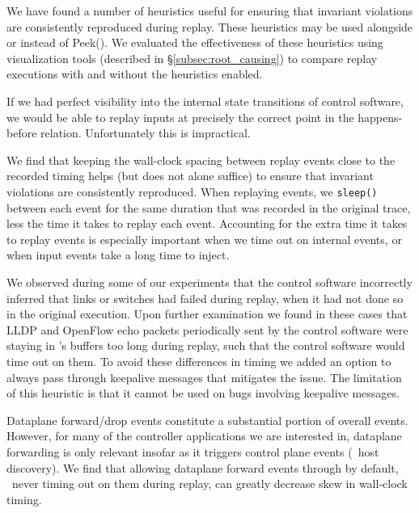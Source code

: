 We have found a number of
heuristics useful for ensuring that invariant violations are consistently reproduced during replay.
These heuristics may be used alongside or instead of {\sc Peek()}. We evaluated the effectiveness
of these heuristics using visualization tools
(described in \S\ref{subsec:root_causing}) to compare replay executions with and
without the heuristics enabled.

 If we had perfect visibility into
the internal state transitions of control software, we would be able to replay inputs at precisely the correct point in
the happens-before relation. Unfortunately this is impractical.

We find that keeping the wall-clock spacing between replay events
close to the recorded timing helps (but does not alone suffice) to
ensure that invariant violations are consistently
reproduced. When replaying events, we \verb=sleep()= between each
event for the same duration that was recorded in the original trace,
less the time it takes to replay each event. Accounting for the
extra time it takes to replay events is especially important when we
time out on internal events, or when input events take a long time to inject.

 We observed during some
of our experiments that the control software incorrectly inferred that links or switches had
failed during replay, when it had not done so in the original execution.
Upon further examination we found in these cases that LLDP and OpenFlow echo
packets periodically sent by the control software were
staying in \projectname's buffers too long during replay, such that the
control software would time out on them. To avoid these differences in timing
we added an option to always pass through
keepalive messages that mitigates the issue. The limitation of this
heuristic is that it cannot be used on bugs involving keepalive messages.


 Dataplane forward/drop events constitute a
substantial portion of overall events. However, for
many of the controller applications we are interested in, dataplane
forwarding is only relevant insofar as it triggers control plane events
(\eg~host discovery). We find that allowing dataplane forward events through by
default, \ie~never timing out on them during replay, can greatly decrease
skew in wall-clock timing.

